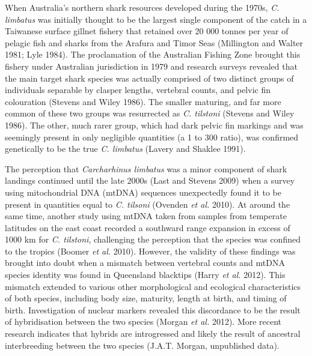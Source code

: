 \documentclass[]{article}
\begin{document}
When Australia's northern shark resources developed during the 1970s,
\emph{C. limbatus} was initially thought to be the largest single
component of the catch in a Taiwanese surface gillnet fishery that
retained over 20 000 tonnes per year of pelagic fish and sharks from the
Arafura and Timor Seas (Millington and Walter 1981; Lyle 1984). The
proclamation of the Australian Fishing Zone brought this fishery under
Australian jurisdiction in 1979 and research surveys revealed that the
main target shark species was actually comprised of two distinct groups
of individuals separable by clasper lengths, vertebral counts, and
pelvic fin colouration (Stevens and Wiley 1986). The smaller maturing,
and far more common of these two groups was resurrected as \emph{C.
tilstoni} (Stevens and Wiley 1986). The other, much rarer group, which
had dark pelvic fin markings and was seemingly present in only
negligible quantities (a 1 to 300 ratio), was confirmed genetically to
be the true \emph{C. limbatus} (Lavery and Shaklee 1991).

The perception that \emph{Carcharhinus limbatus} was a minor component
of shark landings continued until the late 2000s (Last and Stevens 2009)
when a survey using mitochondrial DNA (mtDNA) sequences unexpectedly
found it to be present in quantities equal to \emph{C. tilsoni} (Ovenden
\emph{et al.} 2010). At around the same time, another study using mtDNA
taken from samples from temperate latitudes on the east coast recorded a
southward range expansion in excess of 1000 km for \emph{C. tilstoni},
challenging the perception that the species was confined to the tropics
(Boomer \emph{et al.} 2010). However, the validity of these findings was
brought into doubt when a mismatch between vertebral counts and mtDNA
species identity was found in Queensland blacktips (Harry \emph{et al.}
2012). This mismatch extended to various other morphological and
ecological characteristics of both species, including body size,
maturity, length at birth, and timing of birth. Investigation of nuclear
markers revealed this discordance to be the result of hybridisation
between the two species (Morgan \emph{et al.} 2012). More recent
research indicates that hybrids are introgressed and likely the result
of ancestral interbreeding between the two species (J.A.T. Morgan,
unpublished data).
\end{document}
